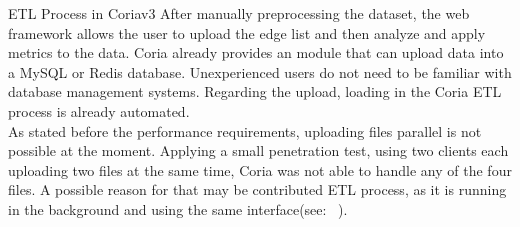 \documentclass[conference, 11pt]{IEEEtran}
\begin{document}
\begin{subsection}{ETL Process in Coriav3}
After manually preprocessing the dataset, the web framework allows the user to upload the edge list and then analyze and apply metrics to the data.
Coria already provides an module that can upload data into a MySQL or Redis database. Unexperienced users do not need to be familiar with database management systems. Regarding the upload, loading in the Coria ETL process is already automated. \\ \linebreak
As stated before the performance requirements, uploading files parallel is not possible at the moment. Applying a small penetration test, using two clients each uploading two files at the same time, Coria was not able to handle any of the four files. A possible reason for that may be contributed ETL process, as it is running in the background and using the same interface(see: ~).   \linebreak

\end{subsection}
\end{document}
